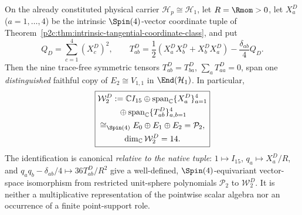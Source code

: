 \documentclass[12pt,a4paper]{article}
\begin{document}
\begin{theorem}
\label{p2c:thm:v268-native-jordan-quadratic-copy}
On the already constituted physical carrier
$\mathcal H_p\cong\mathcal H_1$, let $R=\Rmom>0$, let $X_a^D$
($a=1,\ldots,4$) be the intrinsic $\Spin(4)$-vector coordinate tuple
of Theorem~\ref{p2c:thm:intrinsic-tangential-coordinate-class}, and put
\[
 Q_D=\sum_{c=1}^4(X_c^D)^2,\qquad
 T_{ab}^D=\frac12(X_a^DX_b^D+X_b^DX_a^D)
                     -\frac{\delta_{ab}}4 Q_D.
\]
Then the nine trace-free symmetric tensors $T_{ab}^D=T_{ba}^D$,
$\sum_aT_{aa}^D=0$, span one \emph{distinguished} faithful copy of
$E_2\cong V_{1,1}$ in $\End(\mathcal H_1)$.  In particular,
\[
 \boxed{\begin{gathered}
 \mathcal W_2^D:=\mathbb CI_{15}\oplus
      \operatorname{span}_{\mathbb C}\{X_a^D\}_{a=1}^4\\
      {}\oplus\operatorname{span}_{\mathbb C}\{T_{ab}^D\}_{a,b=1}^4\\
 \cong_{\Spin(4)} E_0\oplus E_1\oplus E_2=\mathcal P_2,\\
 \dim_{\mathbb C}\mathcal W_2^D=14.
 \end{gathered}}
\]
The identification is canonical \emph{relative to the native tuple}:
$1\mapsto I_{15}$, $q_a\mapsto X_a^D/R$, and
$q_aq_b-\delta_{ab}/4\mapsto36T_{ab}^D/R^2$ give a well-defined,
$\Spin(4)$-equivariant vector-space isomorphism from restricted unit-sphere
polynomials $\mathcal P_2$ to $\mathcal W_2^D$.
It is neither a multiplicative representation of the pointwise
scalar algebra nor an occurrence of a finite point-support role.
\end{theorem}
\end{document}
